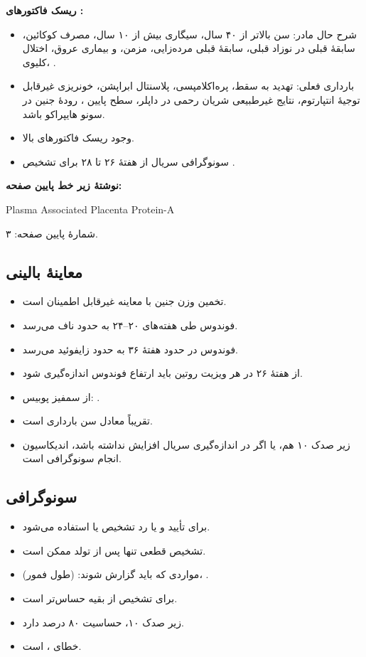 \documentclass[12pt,a4paper]{article}
\begin{document}
\textbf{ریسک فاکتورهای :}
\begin{itemize}
\item شرح حال مادر: سن بالاتر از ۴۰ سال، سیگاری بیش از ۱۰ سال، مصرف کوکائین، سابقهٔ قبلی  در نوزاد قبلی، سابقهٔ قبلی مرده‌زایی،  مزمن،  و بیماری عروق، اختلال کلیوی، .
\item بارداری فعلی: تهدید به سقط، پره‌اکلامپسی، پلاسنتال ابراپشن، خونریزی غیرقابل توجیهٔ انتپارتوم، نتایج غیرطبیعی شریان رحمی در داپلر، سطح پایین ، رودهٔ جنین در سونو هایپراکو باشد.
\item وجود ریسک فاکتورهای بالا.
\item سونوگرافی سریال از هفتهٔ ۲۶ تا ۲۸ برای تشخیص .
\end{itemize}
\textbf{نوشتهٔ زیر خط پایین صفحه:}
\begin{latin}
Plasma Associated Placenta Protein-A
\end{latin}

\FGheader\par
شمارهٔ پایین صفحه: ۳.

\subsection*{معاینهٔ بالینی}
\begin{itemize}
\item تخمین وزن جنین با معاینه غیرقابل اطمینان است.
\item فوندوس طی هفته‌های ۲۰–۲۴ به حدود ناف می‌رسد.
\item فوندوس در حدود هفتهٔ ۳۶ به حدود زایفوئید می‌رسد.
\item از هفتهٔ ۲۶ در هر ویزیت روتین باید ارتفاع فوندوس اندازه‌گیری شود.
\item از سمفیز پوبیس: .
\item تقریباً معادل سن بارداری است.
\item {} زیر صدک ۱۰ هم، یا اگر در اندازه‌گیری سریال افزایش نداشته باشد، اندیکاسیون انجام سونوگرافی است.
\end{itemize}

\subsection*{سونوگرافی}
\begin{itemize}
\item برای تأیید و یا رد تشخیص  یا  استفاده می‌شود.
\item تشخیص قطعی تنها پس از تولد ممکن است.
\item مواردی که باید گزارش شوند:  (طول فمور)، .
\item {} برای تشخیص  از بقیه حساس‌تر است.
\item زیر صدک ۱۰، حساسیت ۸۰ درصد دارد.
\item خطای ،  است.
\end{itemize}
\end{document}

